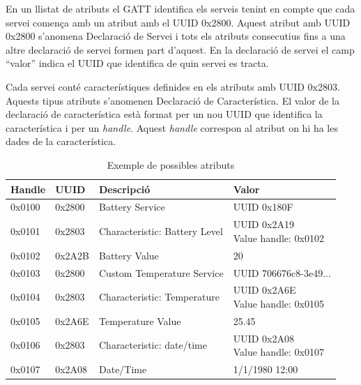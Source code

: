 En un llistat de atributs el GATT identifica els serveis tenint en compte que cada servei comença amb un atribut amb el UUID 0x2800.
Aquest atribut amb UUID 0x2800 s'anomena Declaració de Servei i tots els atributs consecutius fins a una altre declaració de servei formen part d'aquest.
En la declaració de servei el camp ``valor'' indica el UUID que identifica de quin servei es tracta.

Cada servei conté característiques \cite{characteristics} definides en els atributs amb UUID 0x2803.
Aquests tipus atributs s'anomenen Declaració de Característica.
El valor de la declaració de característica està format per un nou UUID que identifica la característica i per un \textit{handle}.
Aquest \textit{handle} correspon al atribut on hi ha les dades de la característica.

\begin{table}[h]
	\begin{center}
		\begin{tabular}{|l|l|l|l|}
			\hline
			Handle	&	UUID	&	Descripció						&	Valor		\\ 	\hline \rowcolor{lightred}
			0x0100	&	0x2800	&	Battery Service					&	UUID 0x180F	\\		\hline \rowcolor{lightyellow}
			0x0101	&	0x2803	&	Characteristic: Battery Level	&	\parbox[t]{4cm}{UUID 0x2A19	\\ Value handle: 0x0102}	\\	\hline
			0x0102	&	0x2A2B	&	Battery Value					&	20	\\	\hline	{}
			0x0103	&	0x2800	&	Custom Temperature Service		&	UUID 	706676c8-3e49...	\\	\hline	{}
			0x0104	&	0x2803	&	Characteristic: Temperature		&	\parbox[t]{4cm}{UUID 0x2A6E	\\ Value handle: 0x0105}	\\		\hline	
			0x0105	&	0x2A6E	&	Temperature Value				&	25.45	\\	\hline {}
			0x0106	&	0x2803	&	Characteristic: date/time		&	\parbox[t]{4cm}{UUID 0x2A08	\\ Value handle: 0x0107}	\\		\hline
			0x0107	&	0x2A08	&	Date/Time						&	1/1/1980 12:00	\\
			\hline
		\end{tabular}	
		\caption{Exemple de possibles atributs}
		\label{Attribute_Table}
	\end{center}
\end{table}

